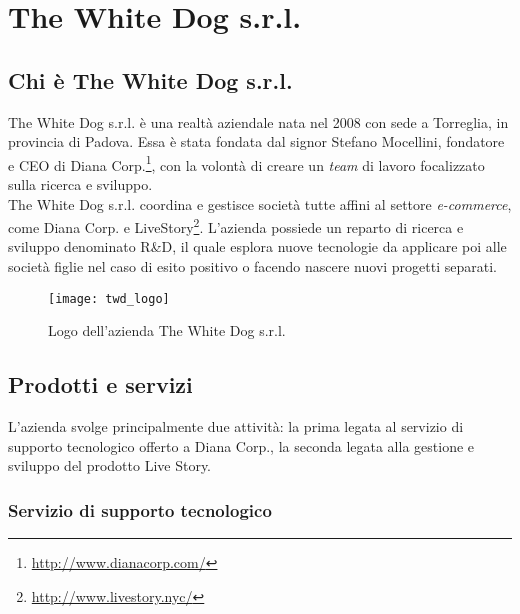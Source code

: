 \newpage
\chapter{The White Dog s.r.l.}
\label{cap:thewhitedog}

\section{Chi è The White Dog s.r.l.}

The White Dog s.r.l. è una realtà aziendale nata nel 2008 con sede a Torreglia, in provincia di Padova. Essa è stata fondata dal signor Stefano Mocellini, fondatore e CEO di Diana Corp.\footnote[1]{\url{http://www.dianacorp.com/}}, con la volontà di creare un \textit{team} di lavoro focalizzato sulla ricerca e sviluppo. \\
The White Dog s.r.l. coordina e gestisce società tutte affini al settore \textit{e-commerce}, come Diana Corp. e LiveStory\footnote[2]{\url{http://www.livestory.nyc/}}. L'azienda possiede un reparto di ricerca e sviluppo denominato R\&D, il quale esplora nuove tecnologie da applicare poi alle società figlie nel caso di esito positivo o facendo nascere nuovi progetti separati.

\label{The White Dog s.r.l.}
\begin{figure}[ht]
	\begin{center}
		\texttt{[image: twd\_logo]}
		\caption{Logo dell'azienda The White Dog s.r.l.}
	\end{center}
\end{figure}
\FloatBarrier

\section{Prodotti e servizi}

L'azienda svolge principalmente due attività: la prima legata al servizio di supporto tecnologico offerto a Diana Corp., la seconda legata alla gestione e sviluppo del prodotto Live Story.

\subsection{Servizio di supporto tecnologico}

